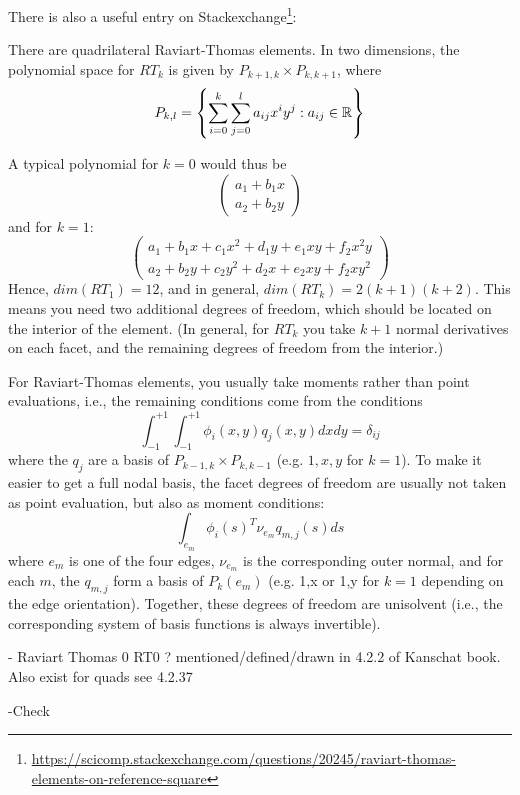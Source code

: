 There is also a useful entry on Stackexchange\footnote{\url{
https://scicomp.stackexchange.com/questions/20245/raviart-thomas-elements-on-reference-square}}:
\begin{displayquote}
{\color{darkgray}
There are quadrilateral Raviart-Thomas elements. 
In two dimensions, the polynomial space for $RT_k$ is given by 
$P_{k+1,k} \times P_{k,k+1}$, where
\[
P_{k,l}=\left\{ \sum_{i=0}^{k} \sum_{j=0}^{l} a_{ij} x^i y^j: a_{ij}\in {\mathbb{R}}  \right\}
\]

A typical polynomial for $k=0$ would thus be 
\[
\left(
\begin{array}{c}
a_1+b_1 x \\
a_2+b_2 y
\end{array}
\right)
\]
and for $k=1$:
\[
\left(
\begin{array}{c}
a_1+b_1 x +c_1x^2 +d_1 y + e_1 xy  + f_2 x^2 y\\
a_2+b_2 y +c_2y^2 +d_2 x + e_2 xy  + f_2 x y^2
\end{array}
\right)
\]
Hence, $dim(RT_1)=12$, and in general, $dim(RT_k)=2(k+1)(k+2)$. 
This means you need two additional degrees of freedom, which should be located on the 
interior of the element. (In general, for $RT_k$ you take $k+1$ normal derivatives on each facet, 
and the remaining degrees of freedom from the interior.)

For Raviart-Thomas elements, you usually take moments rather than 
point evaluations, i.e., the remaining conditions come from the conditions 
\[
\int_{-1}^{+1} \int_{-1}^{+1} \phi_i(x,y)q_j(x,y)dx dy = \delta_{ij}
\]
where the ${q_j}$ are a basis of $P_{k-1,k}\times P_{k,k-1}$ (e.g. $1,x,y$ for $k=1$).
To make it easier to get a full nodal basis, the facet degrees of freedom are 
usually not taken as point evaluation, but also as moment conditions: 
\[
\int_{e_m} \phi_i(s)^T \nu_{e_m} q_{m,j}(s) ds
\]
where $e_m$ is one of the four edges, $\nu_{e_m}$ is the corresponding outer normal, 
and for each $m$, the $q_{m,j}$ form a basis of $P_k(e_m)$ (e.g. {1,x} or {1,y}
for $k=1$ depending on the edge orientation).
Together, these degrees of freedom are unisolvent (i.e., the corresponding system 
of basis functions is always invertible).
}
\end{displayquote}




- Raviart Thomas 0 RT0 \cite{rath77} ? mentioned/defined/drawn in 4.2.2 of 
Kanschat book. Also exist for quads see 4.2.37

-Check \textcite{brfo}



